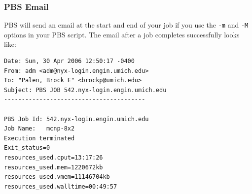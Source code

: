 \documentclass[handout]{beamer}
\begin{document}
\begin{frame}[fragile]
 \frametitle{PBS Email}
PBS will send an email at the start and end of your job if you use the
\texttt{-m} and \texttt{-M} options in your PBS script.  The email after a job
completes successfully looks like:
\tiny
\begin{verbatim}
Date: Sun, 30 Apr 2006 12:50:17 -0400
From: adm <adm@nyx-login.engin.umich.edu>
To: "Palen, Brock E" <brockp@umich.edu>
Subject: PBS JOB 542.nyx-login.engin.umich.edu
----------------------------------------

PBS Job Id: 542.nyx-login.engin.umich.edu
Job Name:   mcnp-8x2
Execution terminated
Exit_status=0
resources_used.cput=13:17:26
resources_used.mem=1220672kb
resources_used.vmem=11146704kb
resources_used.walltime=00:49:57
\end{verbatim}
\normalsize
\end{frame}
\end{document}
